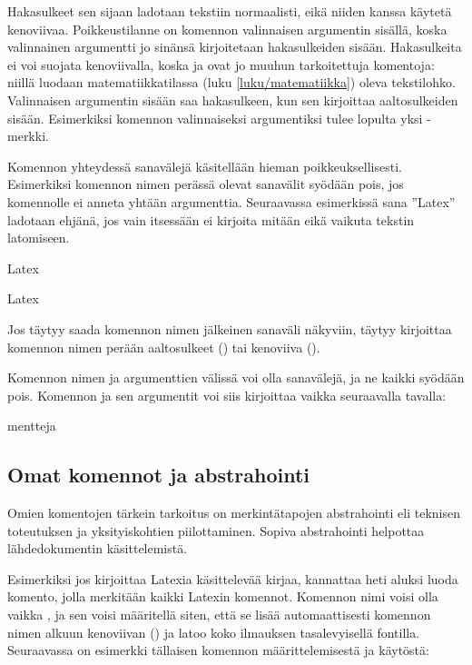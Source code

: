 Hakasulkeet sen sijaan ladotaan tekstiin normaalisti, eikä niiden kanssa
käytetä kenoviivaa. Poikkeustilanne on komennon valinnaisen argumentin
sisällä, koska valinnainen argumentti jo sinänsä kirjoitetaan
hakasulkeiden sisään. Hakasulkeita ei voi suojata kenoviivalla, koska
\komento{[} ja \komento{]} ovat jo muuhun tarkoitettuja komentoja:
niillä luodaan matematiikkatilassa (luku \ref{luku/matematiikka}) oleva
tekstilohko. Valinnaisen argumentin sisään saa hakasulkeen, kun sen
kirjoittaa aaltosulkeiden sisään. Esimerkiksi komennon
\komentoargv{\{]\}} valinnaiseksi argumentiksi tulee
lopulta yksi \koodi{]}-merkki.

Komennon yhteydessä sanavälejä käsitellään hieman poikkeuksellisesti.
Esimerkiksi komennon nimen perässä olevat sanavälit syödään pois, jos
komennolle ei anneta yhtään argumenttia. Seuraavassa esimerkissä sana
''Latex'' ladotaan ehjänä, jos vain  itsessään ei
kirjoita mitään eikä vaikuta tekstin latomiseen.

\begin{koodilohkosis}
La\komento   tex
\end{koodilohkosis}

\begin{tulossis}
  Latex
\end{tulossis}

\noindent
Jos täytyy saada komennon nimen jälkeinen sanaväli näkyviin, täytyy
kirjoittaa komennon nimen perään aaltosulkeet
(\komentoarg{}) tai kenoviiva
(\komentojatko{\keno}).

Komennon nimen ja argumenttien välissä voi olla sanavälejä, ja ne kaikki
syödään pois. Komennon ja sen argumentit voi siis kirjoittaa vaikka
seuraavalla tavalla:

\begin{koodilohkosis}
   {mentteja}
\end{koodilohkosis}

\subsection{Omat komennot ja abstrahointi}
\label{luku/komennot-abst}

Omien komentojen tärkein tarkoitus on merkintätapojen abstrahointi eli
teknisen toteutuksen ja yksityiskohtien piilottaminen. Sopiva
abstrahointi helpottaa lähdedokumentin käsittelemistä.

Esimerkiksi jos kirjoittaa Latexia käsittelevää kirjaa, kannattaa heti
aluksi luoda komento, jolla merkitään kaikki Latexin komennot. Komennon
nimi voisi olla vaikka , ja sen voisi määritellä
siten, että se lisää automaattisesti komennon nimen alkuun kenoviivan
(\koodi{\keno}) ja latoo koko ilmauksen tasalevyisellä fontilla.
Seuraavassa on esimerkki tällaisen komennon määrittelemisestä ja
käytöstä:

